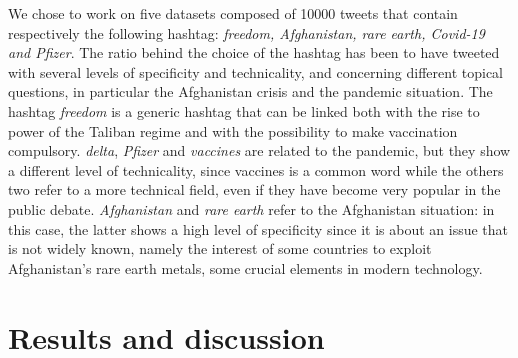 \documentclass[12pt,%
               a4paper,%
               oneside,openany,%
               titlepage,%
               headinclude,footinclude,%
               BCOR5mm,%
               cleardoublepage=empty,%
               tablecaptionabove,%
               floatperchapter,
               ]{scrreprt}                 %
\begin{document}
We chose to work on five datasets composed of 10000 tweets that contain respectively the following hashtag: \textit{freedom, Afghanistan, rare earth, Covid-19 and Pfizer}.  The ratio behind the choice of the hashtag has been to have tweeted with several levels of specificity and technicality, and concerning different topical questions, in particular the Afghanistan crisis and the pandemic situation. The hashtag \textit{freedom} is a generic hashtag that can be linked both with the rise to power of the Taliban regime and with the possibility to make vaccination compulsory.  \textit{delta}, \textit{Pfizer} and \textit{vaccines} are related to the pandemic,  but they show a different level of technicality, since vaccines is a common word while the others two refer to a more technical field, even if they have become very popular in the public debate.  \textit{Afghanistan} and \textit{rare earth } refer to the Afghanistan situation: in this case, the latter shows a high level of specificity since it is about an issue that is not widely known, namely the interest of some countries to exploit Afghanistan’s rare earth metals, some crucial elements in modern technology.


\chapter{Results and discussion}
\end{document}
